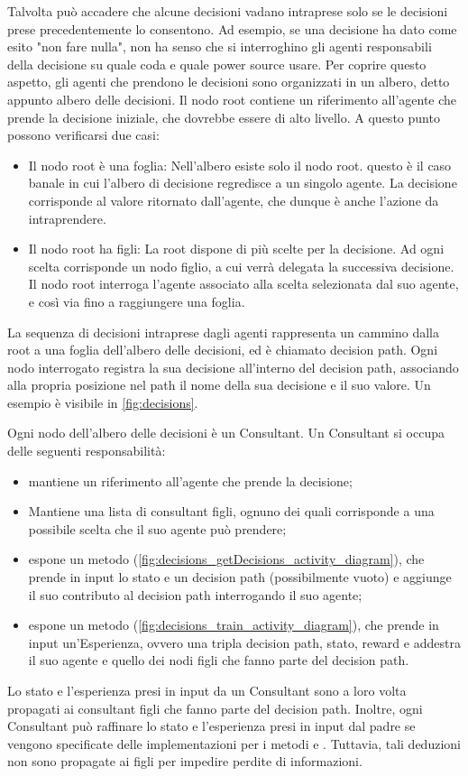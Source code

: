 \documentclass[conference]{IEEEtran}
\begin{document}
Talvolta può accadere che alcune decisioni vadano intraprese solo se le decisioni prese
precedentemente lo consentono. Ad esempio, se una decisione ha dato come esito
"non fare nulla", non ha senso che si interroghino gli agenti responsabili
della decisione su quale coda e quale power source usare. Per coprire questo aspetto,
gli agenti che prendono le decisioni sono organizzati in un albero, detto appunto
albero delle decisioni. Il nodo root contiene un riferimento all'agente che prende
la decisione iniziale, che dovrebbe essere di alto livello.
A questo punto possono verificarsi due casi:
\begin{itemize}
    \item Il nodo root è una foglia: Nell'albero esiste solo il nodo root. questo
    è il caso banale in cui l'albero di decisione regredisce a un singolo agente.
    La decisione corrisponde al valore ritornato dall'agente, che dunque è anche
    l'azione da intraprendere.
    \item Il nodo root ha figli: La root dispone di più scelte per la decisione.
    Ad ogni scelta corrisponde un nodo figlio, a cui verrà delegata la successiva
    decisione. Il nodo root interroga l'agente associato alla scelta selezionata
    dal suo agente, e così via fino a raggiungere una foglia.
\end{itemize}
La sequenza di decisioni
intraprese dagli agenti rappresenta un cammino dalla root a una foglia dell'albero
delle decisioni, ed è chiamato decision path.
Ogni nodo interrogato registra la sua decisione all'interno del decision path, 
associando alla propria posizione nel path il nome della sua decisione e il suo
valore. Un esempio è visibile in \autoref{fig:decisions}.

Ogni nodo dell'albero delle decisioni è un Consultant. Un Consultant si occupa
delle seguenti responsabilità:
\begin{itemize}
    \item mantiene un riferimento all'agente che prende la decisione;
    \item Mantiene una lista di consultant figli, ognuno dei quali corrisponde
    a una possibile scelta che il suo agente può prendere;
    \item espone un metodo (\autoref{fig:decisions_getDecisions_activity_diagram}), che prende in input
    lo stato e un decision path (possibilmente vuoto) e aggiunge il suo contributo
    al decision path interrogando il suo agente;
    \item espone un metodo (\autoref{fig:decisions_train_activity_diagram}), che prende in input un'Esperienza,
    ovvero una tripla
    decision path, stato, reward e addestra il suo agente e quello dei nodi
    figli che fanno parte del decision path.
\end{itemize}
Lo stato e l'esperienza presi in input da un Consultant sono a loro volta
propagati ai consultant figli che fanno parte del decision path. Inoltre,
ogni Consultant può raffinare lo stato e l'esperienza presi in input dal padre
se vengono specificate delle implementazioni per i metodi 
e . Tuttavia, tali deduzioni non sono propagate ai figli
per impedire perdite di informazioni. 
\end{document}
